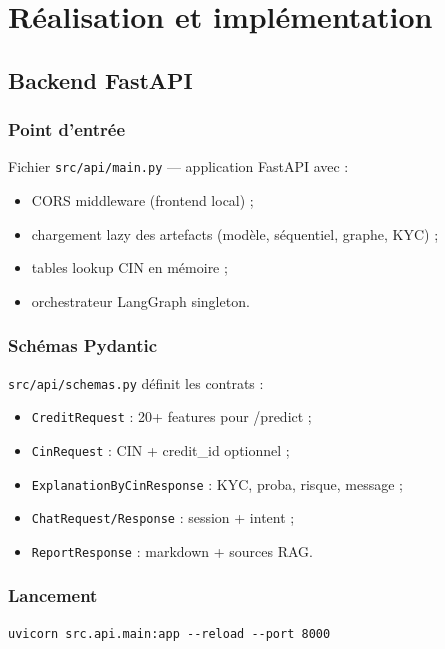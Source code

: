 \chapter{Réalisation et implémentation}
\label{ch:realisation}

\section{Backend FastAPI}

\subsection{Point d'entrée}

Fichier \texttt{src/api/main.py} — application FastAPI avec :
\begin{itemize}[leftmargin=*]
  \item CORS middleware (frontend local) ;
  \item chargement lazy des artefacts (modèle, séquentiel, graphe, KYC) ;
  \item tables lookup CIN en mémoire ;
  \item orchestrateur LangGraph singleton.
\end{itemize}

\subsection{Schémas Pydantic}

\texttt{src/api/schemas.py} définit les contrats :
\begin{itemize}[leftmargin=*]
  \item \texttt{CreditRequest} : 20+ features pour /predict ;
  \item \texttt{CinRequest} : CIN + credit\_id optionnel ;
  \item \texttt{ExplanationByCinResponse} : KYC, proba, risque, message ;
  \item \texttt{ChatRequest/Response} : session + intent ;
  \item \texttt{ReportResponse} : markdown + sources RAG.
\end{itemize}

\subsection{Lancement}

\begin{lstlisting}[caption={Démarrage serveur API}]
uvicorn src.api.main:app --reload --port 8000
\end{lstlisting}


